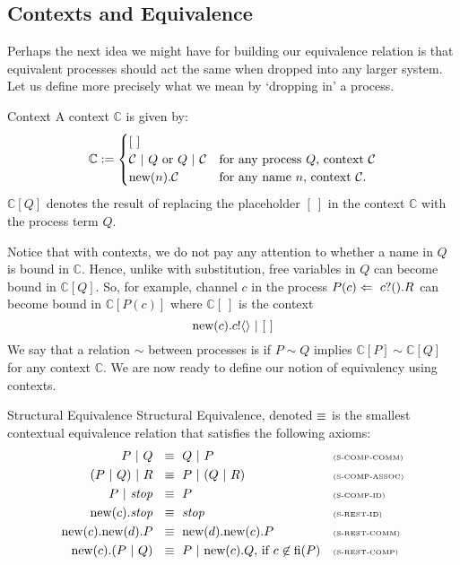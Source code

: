 \subsection{Contexts and Equivalence}
Perhaps the next idea we might have for building our equivalence relation is that equivalent processes should act the same when dropped into any larger system.  
Let us define more precisely what we mean by `dropping in' a process.
\begin{definition}{Context}
	A context $\mathbb{C}$ is given by:
	\[
		\mathbb{C} := \begin{cases}
		[\ ]\\
		\mathcal{C} \ |\  Q \text{ or } Q \ |\  \mathcal{C} & \text{for any process $Q$, context $\mathcal{C}$}\\
		\text{new}({n}).\mathcal{C} & \text{for any name $n$, context $\mathcal{C}$}.
		\end{cases}
	\]
	$\mathbb{C}[Q]$ denotes the result of replacing the placeholder $[\ ]$ in the context $\mathbb{C}$ with the process term $Q$.
	\end{definition}
	Notice that with contexts, we do not pay any attention to whether a name in $Q$ is bound in $\mathbb{C}$.  
Hence, unlike with substitution, free variables in $Q$ can become bound in $\mathbb{C}[Q]$.  
So, for example, channel $c$ in the process $P(c) \Leftarrow\  {c}?({}).R$ can become bound in $\mathbb{C}[P(c)]$ where $\mathbb{C}[\ ]$ is the context
\[
	\new{c}\send{c}{} \comp [\ ]
\]
We say that a relation $\sim$ between processes is  if $P\sim Q$ implies $\mathbb{C}[P]\sim \mathbb{C}[Q]$ for any context $\mathbb{C}$.  
We are now ready to define our notion of equivalency using contexts.
	\begin{definition}{Structural Equivalence}
		Structural Equivalence, denoted $\equiv$ is the smallest contextual equivalence relation that satisfies the following axioms:
		\begin{align*}
			P \ |\  Q\ &\  \equiv\  Q \ |\  P && \text{\tiny{(S-COMP-COMM)}}\\
		 	(P \ |\  Q) \ |\  R\ &\ \equiv\ P \ |\  (Q \ |\  R) && \text{\tiny{(S-COMP-ASSOC)}}\\
			P \ |\  \mbox{\emph{stop}}\ &\ \equiv\ P && \text{\tiny{(S-COMP-ID)}}\\
			\text{new}({c}). \mbox{\emph{stop}}\ &\ \equiv\ \mbox{\emph{stop}} && \text{\tiny{(S-REST-ID)}}\\
			\text{new}({c}).\text{new}({d}). P \ &\ \equiv\ \text{new}({d}).\text{new}({c}). P && \text{\tiny{(S-REST-COMM)}}\\
			\text{new}({c}).(P \ |\  Q)\ &\ \equiv\  P \ |\  \text{new}({c}).Q\text{, if } c\not\in \mbox{fi}(P) && \text{\tiny{(S-REST-COMP)}}
		\end{align*}
	\end{definition}
